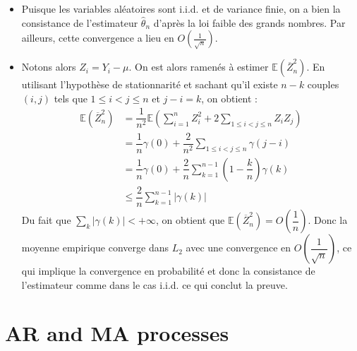 \documentclass[11pt]{article}
\begin{document}
\begin{solution}  %

    \begin{itemize}
        \item Puisque les variables aléatoires sont i.i.d. et de variance finie, on a bien la consistance de l'estimateur $\hat{\theta}_n$ d'après la loi faible des grands nombres. Par ailleurs, cette convergence a lieu en $O(\frac{1}{\sqrt{n}})$.
        \item Notons alors $Z_i = Y_i - \mu$. On est alors ramenés à estimer $\mathbb{E}(\overline{Z}_n^2)$. En utilisant l'hypothèse de stationnarité et sachant qu'il existe $n-k$ couples $(i, j)$ tels que $1 \leq i < j \leq n$ et $j-i = k$, on obtient :
        \begin{align*}
            \mathbb{E}(\overline{Z}_n^2) & = \dfrac{1}{n^2} \mathbb{E}(\sum_{i=1}^{n} Z_i^2 + 2 \sum_{1 \leq i < j \leq n} Z_i Z_j) \\
            & = \dfrac{1}{n} \gamma(0) + \dfrac{2}{n^2} \sum_{1 \leq i < j \leq n} \gamma(j-i) \\
            & = \dfrac{1}{n} \gamma(0) + \dfrac{2}{n} \sum_{k=1}^{n-1} (1-\dfrac{k}{n})\gamma(k) \\
            & \leq \dfrac{2}{n} \sum_{k=1}^{n-1} |\gamma(k)|
        \end{align*}
        Du fait que $\sum_k |\gamma (k)| < +\infty$, on obtient que $\mathbb{E}(\overline{Z}_n^2) = O(\dfrac{1}{n})$. Donc la moyenne empirique converge dans $L_2$ avec une convergence en $O(\dfrac{1}{\sqrt{n}})$, ce qui implique la convergence en probabilité et donc la consistance de l'estimateur comme dans le cas i.i.d. ce qui conclut la preuve.
    \end{itemize}


\end{solution}


\newpage
\section{AR and MA processes}
\end{document}
